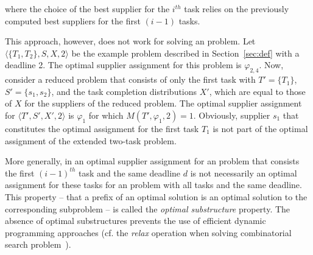 
where the choice of the best supplier for the $i^{th}$ task relies on the previously computed best suppliers for the first $(i-1)$ tasks. 


This approach, however, does not work for solving an \samd problem. 
Let $\langle \{T_1,T_2\}, S, X, 2\rangle$ be the example \samd problem described in Section~\ref{sec:def} with a deadline 2. The optimal supplier assignment for this problem is $\varphi_{2,4}$. Now, consider a reduced problem that consists of only the first task with $T'=\{T_1\}$, $S'=\{s_1,s_2\}$, and the task completion distributions $X'$, which are equal to those of $X$ for the suppliers of the reduced problem. The optimal supplier assignment for $\langle T', S', X', 2\rangle$ is $\varphi_{1}$ for which $M(T',\varphi_{1}, 2)=1$. Obviously, supplier $s_1$ that constitutes the optimal assignment for the first task $T_1$ is not part of the optimal assignment of the extended two-task problem. 

More generally, in \samd an optimal supplier assignment for an \samd problem that consists the first $(i-1)^{th}$ task and the same deadline $d$ is not necessarily an optimal assignment for these tasks for an \samd problem with all tasks and the same deadline. 
This property -- that a prefix of an optimal solution is an optimal solution to the corresponding subproblem -- is called the \emph{optimal substructure} property. The absence of optimal substructures prevents the use of efficient dynamic programming approaches (cf. the \emph{relax} operation when solving combinatorial search problem~\citep{bellman1958routing,dijkstra1959note}). 

